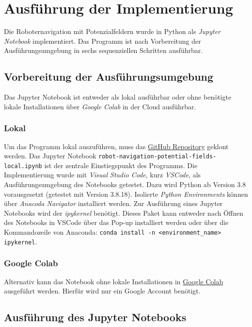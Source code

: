 \chapter{Ausführung der Implementierung}

Die Roboternavigation mit Potenzialfeldern wurde in Python als \textit{Jupyter Notebook} implementiert.
Das Programm ist nach Vorbereitung der Ausführungsumgebung in sechs sequenziellen Schritten ausführbar.

\section{Vorbereitung der Ausführungsumgebung}

Das Jupyter Notebook ist entweder als lokal ausführbar oder ohne benötigte lokale Installationen über \textit{Google Colab} in der Cloud ausführbar.

\subsection*{Lokal}
Um das Programm lokal auszuführen, muss das \href{https://github.com/ca-schue/potential-field.git}{GitHub Repository} geklont werden.
Das Jupyter Notebook \texttt{robot-navigation-potential-fields-local.ipynb} ist der zentrale Einstiegspunkt des Programms.
Die Implementierung wurde mit \textit{Visual Studio Code}, kurz \textit{VSCode}, als Ausführungsumgebung des Notebooks getestet.
Dazu wird Python ab Version 3.8 vorausgesetzt (getestet mit Version 3.8.18).
Isolierte \textit{Python Environments} können über \textit{Anacoda Navigator} installiert werden.
Zur Ausführung eines Jupyter Notebooks wird der \textit{ipykernel} benötigt. Dieses Paket kann entweder nach Öffnen des Notebooks in VSCode über das Pop-up installiert werden oder über die Kommandozeile von Anaconda: \texttt{conda install -n <environment\_name> ipykernel}.

\subsection*{Google Colab}
Alternativ kann das Notebook ohne lokale Installationen in \href{https://colab.research.google.com/gist/ca-schue/73cff6faf02b6d75d84573625fd89bea/robot-navigation-with-potential-fields.ipynb}{Google Colab} ausgeführt werden. Hierfür wird nur ein Google Account benötigt.


\section{Ausführung des Jupyter Notebooks}

